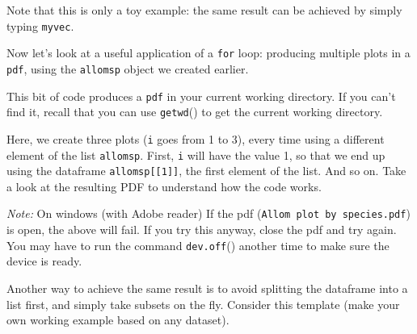\documentclass[]{book}
\newenvironment{Shaded}{\begin{snugshade}}{\end{snugshade}}
\newcommand{\CommentTok}[1]{\textcolor[rgb]{0.56,0.35,0.01}{\textit{#1}}}
\newcommand{\ControlFlowTok}[1]{\textcolor[rgb]{0.13,0.29,0.53}{\textbf{#1}}}
\newcommand{\DataTypeTok}[1]{\textcolor[rgb]{0.13,0.29,0.53}{#1}}
\newcommand{\DecValTok}[1]{\textcolor[rgb]{0.00,0.00,0.81}{#1}}
\newcommand{\KeywordTok}[1]{\textcolor[rgb]{0.13,0.29,0.53}{\textbf{#1}}}
\newcommand{\NormalTok}[1]{#1}
\newcommand{\OperatorTok}[1]{\textcolor[rgb]{0.81,0.36,0.00}{\textbf{#1}}}
\newcommand{\OtherTok}[1]{\textcolor[rgb]{0.56,0.35,0.01}{#1}}
\newcommand{\StringTok}[1]{\textcolor[rgb]{0.31,0.60,0.02}{#1}}
\begin{document}
Note that this is only a toy example: the same result can be achieved by simply typing \texttt{myvec}.

Now let's look at a useful application of a \texttt{for} loop: producing multiple plots in a \texttt{pdf}, using the \texttt{allomsp} object we created earlier.

This bit of code produces a \texttt{pdf} in your current working directory. If you can't find it, recall that you can use \texttt{getwd}() to get the current working directory.

\begin{Shaded}
\end{Shaded}

Here, we create three plots (\texttt{i} goes from 1 to 3), every time using a different element of the list \texttt{allomsp}. First, \texttt{i} will have the value 1, so that we end up using the dataframe \texttt{allomsp{[}{[}1{]}{]}}, the first element of the list. And so on. Take a look at the resulting PDF to understand how the code works.

\emph{Note:} On windows (with Adobe reader) If the pdf (\texttt{Allom\ plot\ by\ species.pdf}) is open, the above will fail. If you try this anyway, close the pdf and try again. You may have to run the command \texttt{dev.off}() another time to make sure the device is ready.

Another way to achieve the same result is to avoid splitting the dataframe into a list first, and simply take subsets on the fly. Consider this template (make your own working example based on any dataset).
\end{document}

